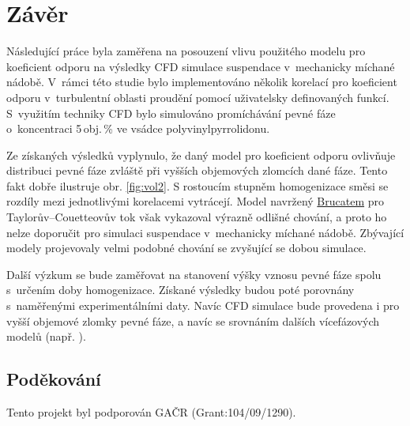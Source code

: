 \chapter{Závěr}
Následující práce byla zaměřena na posouzení vlivu použitého modelu pro koeficient odporu na výsledky CFD simulace suspendace v~mechanicky míchané nádobě. V~rámci této studie bylo implementováno několik korelací pro koeficient odporu v~turbulentní oblasti proudění pomocí uživatelsky definovaných funkcí. S~využitím techniky CFD bylo simulováno promíchávání pevné fáze o~koncentraci 5\,obj.\,\% ve vsádce polyvinylpyrrolidonu.

Ze získaných výsledků vyplynulo, že daný model pro koeficient odporu ovlivňuje distribuci pevné fáze zvláště při vyšších objemových zlomcích dané fáze. Tento fakt dobře ilustruje obr. \ref{fig:vol2}. S rostoucím stupněm homogenizace směsi se rozdíly mezi jednotlivými korelacemi vytrácejí. Model navržený \hyperlink{hyp:cds}{Brucatem} pro Taylorův–Couetteovův tok však vykazoval výrazně odlišné chování, a proto ho nelze doporučit pro simulaci suspendace v~mechanicky míchané nádobě. Zbývající modely projevovaly velmi podobné chování se zvyšující se dobou simulace. 

Další výzkum se bude zaměřovat na stanovení výšky vznosu pevné fáze spolu s~určením doby homogenizace. Získané výsledky budou poté porovnány s~naměřenými experimentálními daty. Navíc CFD simulace bude provedena i pro vyšší objemové zlomky pevné fáze, a navíc se srovnáním dalších vícefázových modelů (např. ). 

\section*{Poděkování} 
\noindent Tento projekt byl podporován GAČR (Grant:104/09/1290). 
